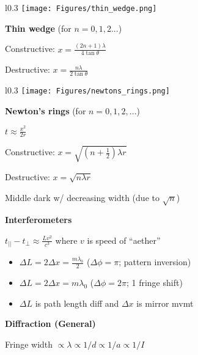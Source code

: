 \documentclass[twocolumn]{article}
\begin{document}
\begin{wrapfigure}[3]{l}{0.3\columnwidth} \vspace{-1em}
    \texttt{[image: Figures/thin\_wedge.png]}
\end{wrapfigure}

\textbf{Thin wedge} (for $n=0,1,2...$)

Constructive: $x = \frac{(2n+1)\lambda}{4 \tan \theta}$

Destructive: $x = \frac{n\lambda}{2 \tan \theta}$

\vspace{1em}

\begin{wrapfigure}[5]{l}{0.3\columnwidth} \vspace{-2em}
    \texttt{[image: Figures/newtons\_rings.png]}
\end{wrapfigure}

\textbf{Newton's rings} (for $n = 0, 1, 2, ...$)

$t \approx \frac{x^2}{2r}$

Constructive: $x = \sqrt{\left( n + \frac{1}{2} \right) \lambda r}$

Destructive: $x = \sqrt{n \lambda r}$

Middle dark w/ decreasing width (due to $\sqrt{n}$)

\vspace{.5em}

\textbf{Interferometers}

$t_{||} - t_{\perp} \approx \frac{Lv^2}{c^3}$ \hfill where $v$ is speed of ``aether''

\vspace{-1em}
\begin{itemize}
    \item $\Delta L = 2 \Delta x = \frac{m \lambda_0}{2}$ \hspace{1em} ($\Delta \phi = \pi$; pattern inversion)
    \item $\Delta L = 2 \Delta x = m \lambda_0$ \hspace{1em} ($\Delta \phi = 2\pi$; 1 fringe shift)
    \item $\Delta L$ is path length diff and $\Delta x$ is mirror mvmt
\end{itemize} \vspace{-1em}

\dotfill

\textbf{Diffraction (General)}

Fringe width $\propto \lambda \propto 1/d \propto 1/a \propto 1/I$
\end{document}
